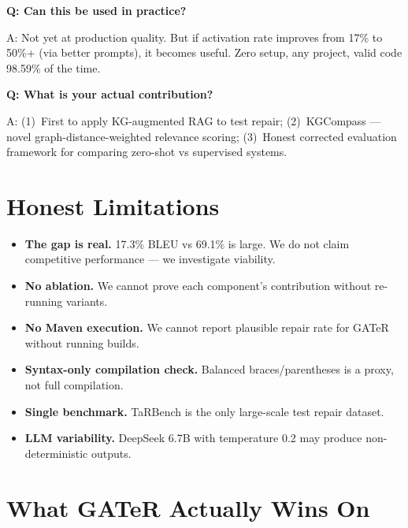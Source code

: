 \documentclass[11pt,a4paper]{article}
\begin{document}
\textbf{Q: Can this be used in practice?}

A: Not yet at production quality.  But if activation rate improves
from 17\% to 50\%+ (via better prompts), it becomes useful.  Zero
setup, any project, valid code 98.59\% of the time.

\textbf{Q: What is your actual contribution?}

A: (1)~First to apply KG-augmented RAG to test repair;
(2)~KGCompass --- novel graph-distance-weighted relevance scoring;
(3)~Honest corrected evaluation framework for comparing zero-shot
vs supervised systems.

\section{Honest Limitations}

\begin{itemize}[nosep,leftmargin=1.5em]
  \item \textbf{The gap is real.}  17.3\% BLEU vs 69.1\% is large.
        We do not claim competitive performance --- we investigate
        viability.
  \item \textbf{No ablation.}  We cannot prove each component's
        contribution without re-running variants.
  \item \textbf{No Maven execution.}  We cannot report plausible
        repair rate for GATeR without running builds.
  \item \textbf{Syntax-only compilation check.}  Balanced
        braces/parentheses is a proxy, not full compilation.
  \item \textbf{Single benchmark.}  TaRBench is the only large-scale
        test repair dataset.
  \item \textbf{LLM variability.}  DeepSeek 6.7B with temperature
        0.2 may produce non-deterministic outputs.
\end{itemize}

\section{What GATeR Actually Wins On}
\end{document}
